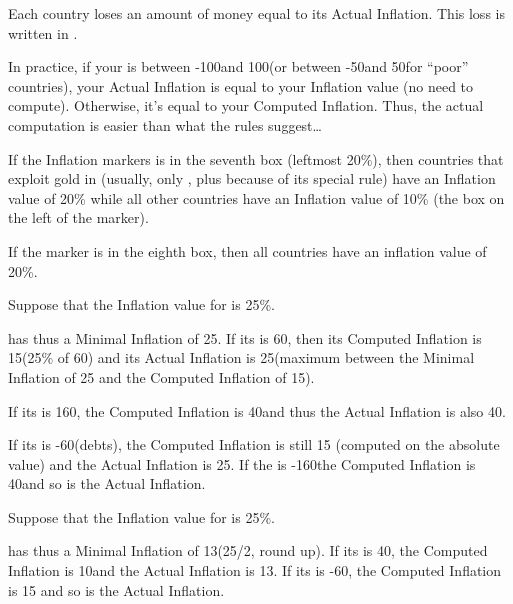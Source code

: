 \aparag[Inflation]
\bparag Each country loses an amount of money equal to its Actual Inflation.
\bparag This loss is written in .

\begin{designnote}
  In practice, if your \RT is between -100\ducats and 100\ducats (or between
  -50\ducats and 50\ducats for ``poor'' countries), your Actual Inflation is
  equal to your Inflation value (no need to compute). Otherwise, it's equal to
  your Computed Inflation. Thus, the actual computation is easier than what
  the rules suggest\ldots
\end{designnote}

\begin{exemple}
  If the Inflation markers is in the seventh box (leftmost 20\%), then
  countries that exploit gold in \continentAmerica (usually, only \HIS, plus
  \TUR because of its special rule) have an Inflation value of 20\% while all
  other countries have an Inflation value of 10\% (the box on the left of the
  marker).

  If the marker is in the eighth box, then all countries have an inflation
  value of 20\%.
\end{exemple}

\begin{exemple}
  Suppose that the Inflation value for \FRA is 25\%.

  \FRA has thus a Minimal Inflation of 25\ducats. If its \RT is 60\ducats,
  then its Computed Inflation is 15\ducats (25\% of 60\ducats) and its Actual
  Inflation is 25\ducats (maximum between the Minimal Inflation of 25\ducats
  and the Computed Inflation of 15\ducats).

  If its \RT is 160\ducats, the Computed Inflation is 40\ducats and thus the
  Actual Inflation is also 40\ducats.

  If its \RT is -60\ducats (debts), the Computed Inflation is still 15\ducats
  (computed on the absolute value) and the Actual Inflation is 25\ducats. If
  the \RT is -160\ducats the Computed Inflation is 40\ducats and so is the
  Actual Inflation.
\end{exemple}

\begin{exemple}
  Suppose that the Inflation value for \POL is 25\%.

  \POL has thus a Minimal Inflation of 13\ducats (25/2, round up). If its \RT
  is 40\ducats, the Computed Inflation is 10\ducats and the Actual Inflation
  is 13\ducats. If its \RT is -60\ducats, the Computed Inflation is 15\ducats
  and so is the Actual Inflation.
\end{exemple}

